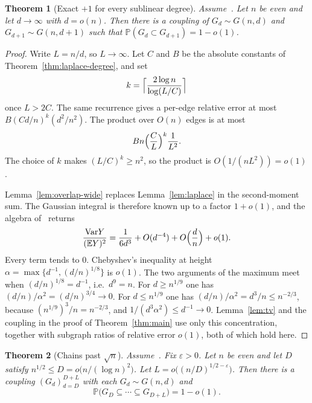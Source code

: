 \documentclass[11pt]{article}
\newtheorem{theorem}{Theorem}
\newcommand{\Gnd}{G(n,d)}
\newcommand{\EE}{\mathbb{E}}
\newcommand{\PP}{\mathbb{P}}
\newcommand{\Var}{\mathrm{Var}}
\begin{document}
\begin{theorem}[Exact \(+1\) for every sublinear degree]
\label{thm:sublinear}
Assume~\cite[Theorem~6]{Gao20}. Let \(n\) be even and let \(d\to\infty\) with \(d=o(n)\).
Then there is a coupling of \(G_d\sim\Gnd\) and \(G_{d+1}\sim G(n,d+1)\) such that
\(\PP(G_d\subset G_{d+1})=1-o(1)\).
\end{theorem}

\begin{proof}
Write \(L=n/d\), so \(L\to\infty\). Let \(C\) and \(B\) be the absolute constants of
Theorem~\ref{thm:laplace-degree}, and set
\[
k=\Bigl\lceil\frac{2\log n}{\log(L/C)}\Bigr\rceil
\]
once \(L>2C\). The same recurrence gives a per-edge relative error at most
\(B(Cd/n)^k(d^2/n^2)\). The product over \(O(n)\) edges is at most
\[
Bn\Bigl(\frac{C}{L}\Bigr)^k\frac1{L^2}.
\]
The choice of \(k\) makes \((L/C)^k\ge n^2\), so the product is \(O(1/(nL^2))=o(1)\).

Lemma~\ref{lem:overlap-wide} replaces Lemma~\ref{lem:laplace} in the second-moment
sum. The Gaussian integral is therefore known up to a factor \(1+o(1)\), and the
algebra of~\cite[§3.4.1]{Gao21} returns
\[
\frac{\Var Y}{(\EE Y)^2}
=
\frac1{6d^3}+O(d^{-4})+O\Bigl(\frac{d}{n}\Bigr)+o(1).
\]
Every term tends to \(0\). Chebyshev's inequality at height
\(\alpha=\max\{d^{-1},(d/n)^{1/8}\}\) is \(o(1)\).
The two arguments of the maximum meet when \((d/n)^{1/8}=d^{-1}\), i.e.\ \(d^9=n\).
For \(d\ge n^{1/9}\) one has \((d/n)/\alpha^2=(d/n)^{3/4}\to 0\).
For \(d\le n^{1/9}\) one has \((d/n)/\alpha^2=d^3/n\le n^{-2/3}\), because
\((n^{1/9})^3/n=n^{-2/3}\), and \(1/(d^3\alpha^2)\le d^{-1}\to 0\).
Lemma~\ref{lem:tv} and the coupling in the proof of Theorem~\ref{thm:main} use only
this concentration, together with subgraph ratios of relative error \(o(1)\), both
of which hold here.
\end{proof}

\begin{theorem}[Chains past \(\sqrt{n}\)]
\label{thm:chain-past-sqrt}
Assume~\cite[Theorem~6]{Gao20}. Fix \(\varepsilon>0\). Let \(n\) be even and let
\(D\) satisfy \(n^{1/2}\le D=o\bigl(n/(\log n)^2\bigr)\). Let
\(L=o\bigl((n/D)^{1/2-\varepsilon}\bigr)\).
Then there is a coupling \((G_d)_{d=D}^{D+L}\) with each \(G_d\sim G(n,d)\) and
\[
\PP\bigl(G_D\subseteq\cdots\subseteq G_{D+L}\bigr)=1-o(1).
\]
\end{theorem}
\end{document}
